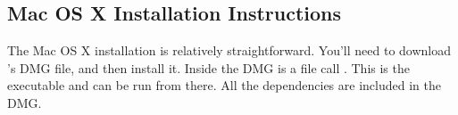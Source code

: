 \subsection{Mac OS X Installation Instructions}
\label{sec:mac-install}

The Mac OS X installation is relatively straightforward.  You'll need to 
download \map{}'s DMG file, and then install it. Inside the DMG is a file
call \map{}. This is the executable and can be run from there.  All the
dependencies are included in the DMG.


